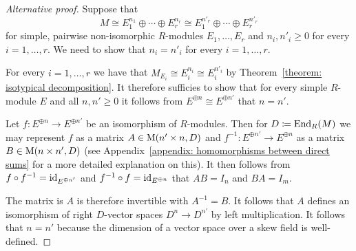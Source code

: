 \begin{proof}[Alternative proof]
  Suppose that
  \[
          M
    \cong E_1^{n_1} \oplus \dotsb \oplus E_r^{n_r}
    \cong E_1^{n'_r} \oplus \dotsb \oplus E_r^{n'_r}
  \]
  for simple, pairwise non-isomorphic $R$-modules $E_1, \dotsc, E_r$ and $n_i, n'_i \geq 0$ for every $i = 1, \dotsc, r$.
  We need to show that $n_i = n'_i$ for every $i = 1, \dotsc, r$.
  
  For every $i = 1, \dotsc, r$ we have that $M_{E_i} \cong E_i^{n_i} \cong E_i^{n'_i}$ by Theorem~\ref{theorem: isotypical decomposition}.
  It therefore sufficies to show that for every simple $R$-module $E$ and all $n, n' \geq 0$ it follows from $E^{\oplus n} \cong E^{\oplus n'}$ that $n = n'$.
  
  Let $f \colon E^{\oplus n} \to E^{\oplus n'}$ be an isomorphism of $R$-modules.
  Then for $D \coloneqq \operatorname{End}_R(M)$ we may represent $f$ as a matrix $A \in \operatorname{M}(n' \times n, D)$ and $f^{-1} \colon E^{\oplus n'} \to E^{\oplus n}$ as a matrix $B \in \operatorname{M}(n \times n', D)$ (see Appendix~\ref{appendix: homomorphisms between direct sums} for a more detailed explanation on this).
  It then follows from $f \circ f^{-1} = \operatorname{id}_{E^{\oplus n'}}$ and $f^{-1} \circ f = \operatorname{id}_{E^{\oplus n}}$ that $AB = I_n$ and $BA = I_m$.
  
  The matrix is $A$ is therefore invertible with $A^{-1} = B$.
  It follows that $A$ defines an isomorphism of right $D$-vector spaces $D^n \to D^{n'}$ by left multiplication.
  It follows that $n = n'$ because the dimension of a vector space over a skew field is well-defined.
\end{proof}


%   
%   


